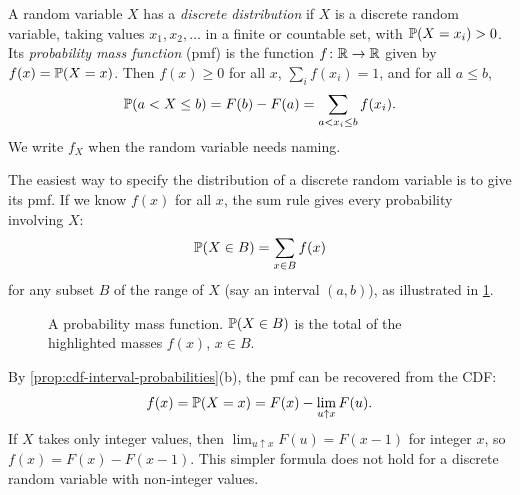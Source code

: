 \begin{definition}\label{def:discrete-distribution}
A random variable $X$ has a \emph{discrete distribution} if $X$ is a discrete random variable, taking values $x_1, x_2, \ldots$ in a finite or countable set, with $\mathbb{P}(X = x_i) > 0$. Its \emph{probability mass function} (pmf) is the function $f \colon \mathbb{R} \to \mathbb{R}$ given by $f(x) = \mathbb{P}(X = x)$. Then $f(x) \ge 0$ for all $x$, $\sum_i f(x_i) = 1$, and for all $a \le b$,
\[
  \mathbb{P}(a < X \le b) = F(b) - F(a) = \sum_{a < x_i \le b} f(x_i).
\]
We write $f_X$ when the random variable needs naming.
\end{definition}

The easiest way to specify the distribution of a discrete random variable is to give its pmf. If we know $f(x)$ for all $x$, the sum rule gives every probability involving $X$:
\begin{equation}\label{eq:pmf-sum-rule}
  \mathbb{P}(X \in B) = \sum_{x \in B} f(x)
\end{equation}
for any subset $B$ of the range of $X$ (say an interval $(a, b)$), as illustrated in \cref{fig:pmf-sum-rule}.

\begin{figure}[H]
\centering
{}
\caption{A probability mass function. $\mathbb{P}(X \in B)$ is the total of the highlighted masses $f(x)$, $x \in B$.}
\label{fig:pmf-sum-rule}
\end{figure}

\begin{remark}\label{rem:pmf-from-cdf}
By \cref{prop:cdf-interval-probabilities}(b), the pmf can be recovered from the CDF:
\[
  f(x) = \mathbb{P}(X = x) = F(x) - \lim_{u \uparrow x} F(u).
\]
If $X$ takes only integer values, then $\lim_{u \uparrow x} F(u) = F(x - 1)$ for integer $x$, so $f(x) = F(x) - F(x - 1)$. This simpler formula does not hold for a discrete random variable with non-integer values.
\end{remark}

